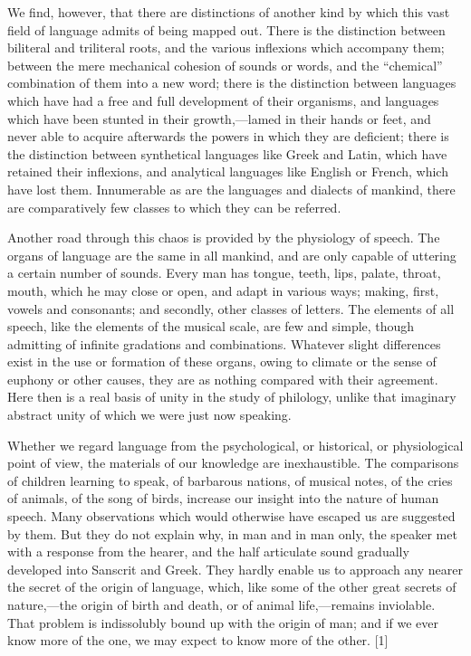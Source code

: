 \documentclass[11pt,letter]{article}
\begin{document}
\par  We find, however, that there are distinctions of another kind by which this vast field of language admits of being mapped out. There is the distinction between biliteral and triliteral roots, and the various inflexions which accompany them; between the mere mechanical cohesion of sounds or words, and the “chemical” combination of them into a new word; there is the distinction between languages which have had a free and full development of their organisms, and languages which have been stunted in their growth,—lamed in their hands or feet, and never able to acquire afterwards the powers in which they are deficient; there is the distinction between synthetical languages like Greek and Latin, which have retained their inflexions, and analytical languages like English or French, which have lost them. Innumerable as are the languages and dialects of mankind, there are comparatively few classes to which they can be referred.

\par  Another road through this chaos is provided by the physiology of speech. The organs of language are the same in all mankind, and are only capable of uttering a certain number of sounds. Every man has tongue, teeth, lips, palate, throat, mouth, which he may close or open, and adapt in various ways; making, first, vowels and consonants; and secondly, other classes of letters. The elements of all speech, like the elements of the musical scale, are few and simple, though admitting of infinite gradations and combinations. Whatever slight differences exist in the use or formation of these organs, owing to climate or the sense of euphony or other causes, they are as nothing compared with their agreement. Here then is a real basis of unity in the study of philology, unlike that imaginary abstract unity of which we were just now speaking.

\par  Whether we regard language from the psychological, or historical, or physiological point of view, the materials of our knowledge are inexhaustible. The comparisons of children learning to speak, of barbarous nations, of musical notes, of the cries of animals, of the song of birds, increase our insight into the nature of human speech. Many observations which would otherwise have escaped us are suggested by them. But they do not explain why, in man and in man only, the speaker met with a response from the hearer, and the half articulate sound gradually developed into Sanscrit and Greek. They hardly enable us to approach any nearer the secret of the origin of language, which, like some of the other great secrets of nature,—the origin of birth and death, or of animal life,—remains inviolable. That problem is indissolubly bound up with the origin of man; and if we ever know more of the one, we may expect to know more of the other. [1]
\end{document}
